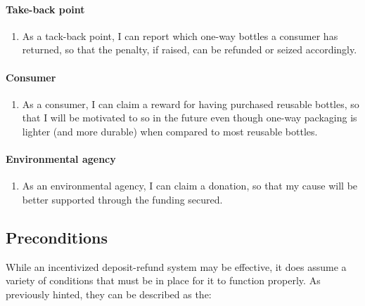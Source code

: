 \paragraph{Take-back point}
\begin{enumerate}[resume, font=\sffamily, label={\textbf{FR-\protect\twodigits{\theenumi}}},leftmargin=1.4cm, ref=FR-\protect\twodigits{\theenumi}]
	\item As a tack-back point, I can report which one-way bottles a consumer has returned, so that the penalty, if raised, can be refunded or seized accordingly. \label{itm:reportOneWayReturn}
\end{enumerate}

\paragraph{Consumer}
\begin{enumerate}[resume, font=\sffamily, label={\textbf{FR-\protect\twodigits{\theenumi}}},leftmargin=1.4cm, ref=FR-\protect\twodigits{\theenumi}]  
	\item As a consumer, I can claim a reward for having purchased reusable bottles, so that I will be motivated to so in the future even though one-way packaging is lighter (and more durable) when compared to most reusable bottles. \label{itm:claimReward}
\end{enumerate}

\paragraph{Environmental agency}
\begin{enumerate}[resume, font=\sffamily, label={\textbf{FR-\protect\twodigits{\theenumi}}},leftmargin=1.4cm, ref=FR-\protect\twodigits{\theenumi}]  
	\item As an environmental agency, I can claim a donation, so that my cause will be better supported through the funding secured. \label{itm:claimDonation}
\end{enumerate}
	
\subsection{Preconditions}
\label{sec:preconditions}
While an incentivized deposit-refund system may be effective, it does assume a variety of conditions that must be in place for it to function properly. As previously hinted, they can be described as the:

